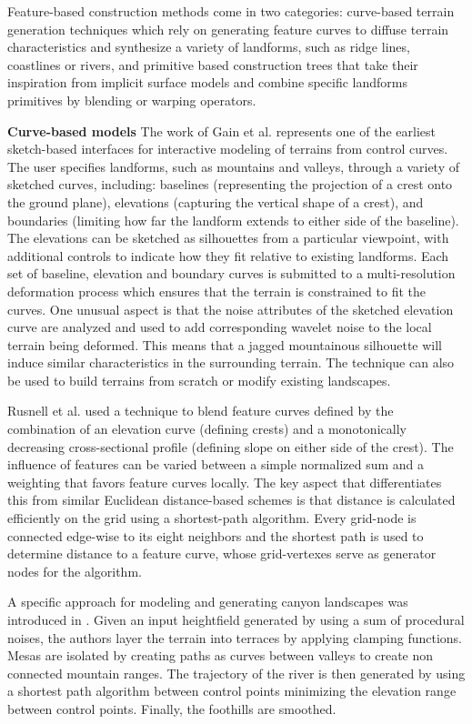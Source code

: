 \documentclass{article}
\begin{document}
Feature-based construction methods come in two categories: curve-based terrain generation techniques which rely on generating feature curves to diffuse terrain characteristics and synthesize a variety of landforms, such as ridge lines, coastlines or rivers, and primitive based construction trees that take their inspiration from implicit surface models and combine specific landforms primitives by blending or warping operators.

\textbf{Curve-based models} The work of Gain et al. \cite{GMS09} represents one of the earliest sketch-based interfaces for interactive modeling of terrains from control curves. The user specifies landforms, such as mountains and valleys, through a variety of sketched curves, including: baselines (representing the projection of a crest onto the ground plane), elevations (capturing the vertical shape of a crest), and boundaries (limiting how far the landform extends to either side of the baseline). The elevations can be sketched as silhouettes from a particular viewpoint, with additional controls to indicate how they fit relative to existing landforms. Each set of baseline, elevation and boundary curves is submitted to a multi-resolution deformation process which ensures that the terrain is constrained to fit the curves. One unusual aspect is that the noise attributes of the sketched elevation curve are analyzed and used to add corresponding wavelet noise to the local terrain being deformed. This means that a jagged mountainous silhouette will induce similar characteristics in the surrounding terrain. The technique can also be used to build terrains from scratch or modify existing landscapes.

Rusnell et al. \cite{RME09} used a technique to blend feature curves defined by the combination of an elevation curve (defining crests) and a monotonically decreasing cross-sectional profile (defining slope on either side of the crest). The influence of features can be varied between a simple normalized sum and a weighting that favors feature curves locally. The key aspect that differentiates this from similar Euclidean distance-based schemes is that distance is calculated efficiently on the grid using a shortest-path algorithm. Every grid-node is connected edge-wise to its eight neighbors and the shortest path is used to determine distance to a feature curve, whose grid-vertexes serve as generator nodes for the algorithm.

A specific approach for modeling and generating canyon landscapes was introduced in \cite{DCPSB14}. Given an input heightfield generated by using a sum of procedural noises, the authors layer the terrain into terraces by applying clamping functions. Mesas are isolated by creating paths as curves between valleys to create non connected mountain ranges. The trajectory of the river is then generated by using a shortest path algorithm between control points minimizing the elevation range between control points. Finally, the foothills are smoothed.
\end{document}
